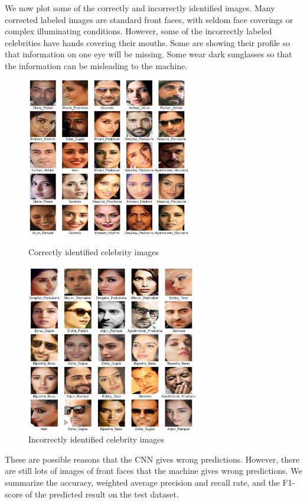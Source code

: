We now plot some of the correctly and incorrectly identified images. Many corrected labeled images are standard front faces, with seldom face coverings or complex illuminating conditions. However, some of the incorrectly labeled celebrities have hands covering their mouths. Some are showing their profile so that information on one eye will be missing. Some wear dark sunglasses so that the information can be misleading to the machine. 
\begin{figure}[H]
    \begin{minipage}[t]{0.47\textwidth}
        \centering\includegraphics[width=7.2cm]{./figures/correct.png}
        \caption{Correctly identified celebrity images}
        \label{pic:correct1}
    \end{minipage}
    \qquad
    \begin{minipage}[t]{0.47\textwidth}
        \centering\includegraphics[width=7.5cm]{./figures/mislabeled.png}
        \caption{Incorrectly identified celebrity images}
        \label{pic:wrong1}
    \end{minipage}
\end{figure}
These are possible reasons that the CNN gives wrong predictions. However, there are still lots of images of front faces that the machine gives wrong predictions. We summarize the accuracy, weighted average precision and recall rate, and the F1-score of the predicted result on the test dataset.
